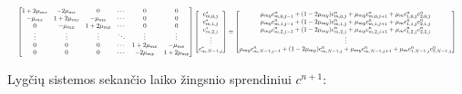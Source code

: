 \begin{align*}
  \resizebox{\textwidth}{!}{$
  \begin{bmatrix}
    1 + 2\mu_{mx} & -2\mu_{mx} & 0 & \cdots & 0 & 0\\
    -\mu_{mx} & 1 + 2\mu_{mx} & -\mu_{mx} & \cdots & 0 & 0\\
    0 & -\mu_{mx} & 1 + 2\mu_{mx} & \cdots & 0 & 0\\
    \vdots & \vdots & \vdots & \ddots & \vdots & \vdots\\
    0 & 0 & 0 & \cdots & 1 + 2\mu_{mx} & -\mu_{mx}\\
    0 & 0 & 0 & \cdots & -2\mu_{mx} & 1 + 2\mu_{mx}
  \end{bmatrix}
  \begin{bmatrix}
    c^*_{m,0,j}\\
    c^*_{m,1,j}\\
    c^*_{m,2,j}\\
    \vdots\\
    c^*_{m,N-1,j}
  \end{bmatrix}
  =
  \begin{bmatrix}
    \mu_{my}c^n_{m,0,j-1}+(1-2\mu_{my})c^n_{m,0,j}+\mu_{my}c^n_{m,0,j+1}+\mu_m c^n_{1,0,j}c^n_{2,0,j}\\
    \mu_{my}c^n_{m,1,j-1}+(1-2\mu_{my})c^n_{m,1,j}+\mu_{my}c^n_{m,1,j+1}+\mu_m c^n_{1,1,j}c^n_{2,1,j}\\
    \mu_{my}c^n_{m,2,j-1}+(1-2\mu_{my})c^n_{m,2,j}+\mu_{my}c^n_{m,2,j+1}+\mu_m c^n_{1,2,j}c^n_{2,2,j}\\
    \vdots\\
    \mu_{my}c^n_{m,N-1,j-1}+(1-2\mu_{my})c^n_{m,N-1,j}+\mu_{my}c^n_{m,N-1,j+1}+\mu_m c^n_{1,N-1,j}c^n_{2,N-1,j}
  \end{bmatrix}
  $}
\end{align*}

Lygčių sistemos sekančio laiko žingsnio sprendiniui $c^{n+1}$:


